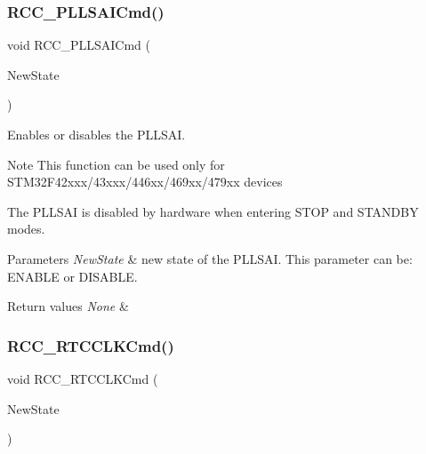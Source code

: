 \subsubsection{\texorpdfstring{R\+C\+C\+\_\+\+P\+L\+L\+S\+A\+I\+Cmd()}{RCC\_PLLSAICmd()}}
{\footnotesize\ttfamily void R\+C\+C\+\_\+\+P\+L\+L\+S\+A\+I\+Cmd (\begin{DoxyParamCaption}\item[{Functional\+State}]{New\+State }\end{DoxyParamCaption})}



Enables or disables the P\+L\+L\+S\+AI. 

\begin{DoxyNote}{Note}
This function can be used only for S\+T\+M32\+F42xxx/43xxx/446xx/469xx/479xx devices

The P\+L\+L\+S\+AI is disabled by hardware when entering S\+T\+OP and S\+T\+A\+N\+D\+BY modes. ~\newline

\end{DoxyNote}

\begin{DoxyParams}{Parameters}
{\em New\+State} & new state of the P\+L\+L\+S\+AI. This parameter can be\+: E\+N\+A\+B\+LE or D\+I\+S\+A\+B\+LE. \\
\hline
\end{DoxyParams}

\begin{DoxyRetVals}{Return values}
{\em None} & \\
\hline
\end{DoxyRetVals}
\mbox{\label{group___r_c_c_ga9802f84846df2cea8e369234ed13b159}} 
\subsubsection{\texorpdfstring{R\+C\+C\+\_\+\+R\+T\+C\+C\+L\+K\+Cmd()}{RCC\_RTCCLKCmd()}}
{\footnotesize\ttfamily void R\+C\+C\+\_\+\+R\+T\+C\+C\+L\+K\+Cmd (\begin{DoxyParamCaption}\item[{Functional\+State}]{New\+State }\end{DoxyParamCaption})}



